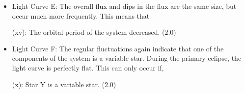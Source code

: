 \begin{description}
\begin{itemize}
    (ix): Star X is a variable star. \hfill(3.0)
  \item Light Curve E: The overall flux and dips in the flux are the same
    size, but occur much more frequently. This means that

    (xv): The orbital period of the system decreased. \hfill(2.0)
  \item Light Curve F: The regular fluctuations again indicate that one of
    the components of the system is a variable star. During the primary
    eclipse, the light curve is perfectly flat. This can only occur if,

    (x): Star Y is a variable star. \hfill(2.0)
  \end{itemize}
\end{description}


